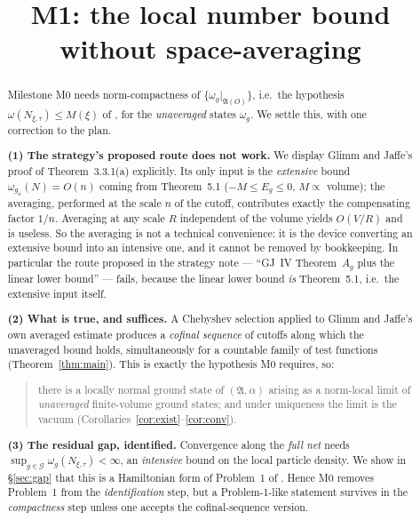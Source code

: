 \documentclass[11pt,a4paper]{article}
\title{M1: the local number bound without space-averaging}
\author{}
\date{}
\theoremstyle{plain}
\theoremstyle{definition}
\newcommand{\A}{\mathfrak{A}}
\newcommand{\G}{\mathcal{G}}
\begin{document}
\maketitle

\begin{abstract}
Milestone M0 needs norm-compactness of $\{\omega_g|_{\A(O)}\}$, i.e.\ the hypothesis
$\omega(N_{\xi,\tau})\le M(\xi)$ of \cite[Thm.~4.1]{GJIII}, for the \emph{unaveraged} states
$\omega_g$. We settle this, with one correction to the plan.

\smallskip
\noindent\textbf{(1) The strategy's proposed route does not work.} We display Glimm and Jaffe's
proof of Theorem~3.3.1(a) explicitly. Its only input is the \emph{extensive} bound
$\omega_{g_n}(N)=O(n)$ coming from Theorem~5.1 ($-M\le E_g\le0$, $M\propto$ volume); the averaging,
performed at the scale $n$ of the cutoff, contributes exactly the compensating factor $1/n$.
Averaging at any scale $R$ independent of the volume yields $O(V/R)$ and is useless. So the
averaging is not a technical convenience: it is the device converting an extensive bound into an
intensive one, and it cannot be removed by bookkeeping. In particular the route proposed in the
strategy note --- ``GJ~IV Theorem~$A_g$ plus the linear lower bound'' --- fails, because the linear
lower bound \emph{is} Theorem~5.1, i.e.\ the extensive input itself.

\smallskip
\noindent\textbf{(2) What is true, and suffices.} A Chebyshev selection applied to Glimm and
Jaffe's own averaged estimate produces a \emph{cofinal sequence} of cutoffs along which the
unaveraged bound holds, simultaneously for a countable family of test functions
(Theorem~\ref{thm:main}). This is exactly the hypothesis M0 requires, so:

\begin{quote}
there is a locally normal ground state of $(\A,\alpha)$ arising as a norm-local limit of
\emph{unaveraged} finite-volume ground states; and under uniqueness the limit is the vacuum
(Corollaries~\ref{cor:exist}--\ref{cor:conv}).
\end{quote}

\noindent\textbf{(3) The residual gap, identified.} Convergence along the \emph{full net} needs
$\sup_{g\in\G}\omega_g(N_{\xi,\tau})<\infty$, an \emph{intensive} bound on the local particle
density. We show in \S\ref{sec:gap} that this is a Hamiltonian form of Problem~1 of
\cite{GRS75}. Hence M0 removes Problem~1 from the \emph{identification} step, but a Problem-1-like
statement survives in the \emph{compactness} step unless one accepts the cofinal-sequence version.
\end{abstract}
\end{document}
